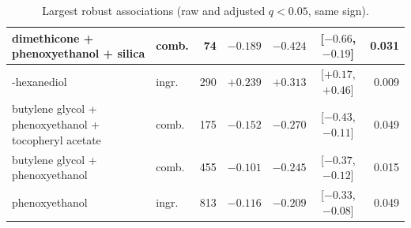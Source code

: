 \begin{table}[htbp]
\begin{tabularx}{\linewidth}{|>{\raggedright\arraybackslash}X|l|r|r|r|c|r|}
\hline
dimethicone + phenoxyethanol + silica & comb. & 74 & $-0.189$ & $-0.424$ & [$-0.66$, $-0.19$] & 0.031 \\
\hline
2-hexanediol & ingr. & 290 & $+0.239$ & $+0.313$ & [$+0.17$, $+0.46$] & 0.009 \\
\hline
butylene glycol + phenoxyethanol + tocopheryl acetate & comb. & 175 & $-0.152$ & $-0.270$ & [$-0.43$, $-0.11$] & 0.049 \\
\hline
butylene glycol + phenoxyethanol & comb. & 455 & $-0.101$ & $-0.245$ & [$-0.37$, $-0.12$] & 0.015 \\
\hline
phenoxyethanol & ingr. & 813 & $-0.116$ & $-0.209$ & [$-0.33$, $-0.08$] & 0.049 \\
\hline
\end{tabularx}
\caption{Largest robust associations (raw and adjusted $q<0.05$, same sign).}
\label{tab:robust}
\end{table}
